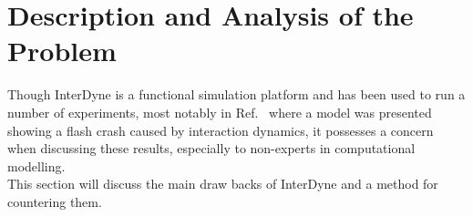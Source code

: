 \documentclass{article}
\begin{document}






\section {Description and Analysis of the Problem} \label{despriptionandanalysproblem}
Though InterDyne is a functional simulation platform and has been used to run a number of experiments, most notably in Ref.~\cite{DynamicCoupling_Chris} where a model was presented showing a flash crash caused by interaction dynamics, it possesses a concern when discussing these results, especially to non-experts in computational modelling.\\
This section will discuss the main draw backs of InterDyne and a method for countering them.  
\end{document}
